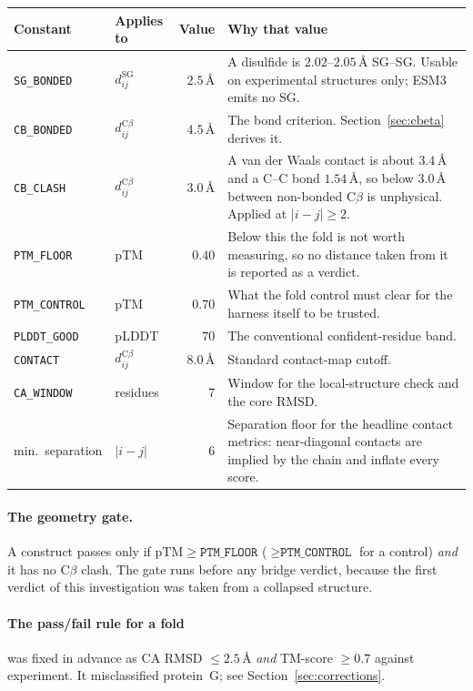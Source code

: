 \documentclass[11pt,a4paper]{article}
\newcommand{\ang}{\,\mbox{\AA}}
\newcommand{\ptm}{\mathrm{pTM}}
\newcommand{\plddt}{pLDDT}
\begin{document}
\begin{center}
\small
\begin{tabular}{@{}llrp{7.6cm}@{}}
\toprule
Constant & Applies to & Value & Why that value \\
\midrule
\texttt{SG\_BONDED}  & $d^{\mathrm{SG}}_{ij}$ & $2.5\ang$ &
  A disulfide is $2.02$--$2.05\ang$ SG--SG. Usable on experimental
  structures only; ESM3 emits no SG. \\
\texttt{CB\_BONDED}  & $d^{\mathrm{C}\beta}_{ij}$ & $4.5\ang$ &
  The bond criterion. Section~\ref{sec:cbeta} derives it. \\
\texttt{CB\_CLASH}   & $d^{\mathrm{C}\beta}_{ij}$ & $3.0\ang$ &
  A van der Waals contact is about $3.4\ang$ and a C--C bond $1.54\ang$, so
  below $3.0\ang$ between non-bonded C$\beta$ is unphysical. Applied at
  $|i-j| \ge 2$. \\
\texttt{PTM\_FLOOR}  & $\ptm$ & $0.40$ &
  Below this the fold is not worth measuring, so no distance taken from it is
  reported as a verdict. \\
\texttt{PTM\_CONTROL}& $\ptm$ & $0.70$ &
  What the fold control must clear for the harness itself to be trusted. \\
\texttt{PLDDT\_GOOD} & \plddt{} & $70$ &
  The conventional confident-residue band. \\
\texttt{CONTACT}     & $d^{\mathrm{C}\beta}_{ij}$ & $8.0\ang$ &
  Standard contact-map cutoff. \\
\texttt{CA\_WINDOW}  & residues & $7$ &
  Window for the local-structure check and the core RMSD. \\
min.\ separation     & $|i-j|$ & $6$ &
  Separation floor for the headline contact metrics: near-diagonal contacts are
  implied by the chain and inflate every score. \\
\bottomrule
\end{tabular}
\end{center}

\paragraph{The geometry gate.} A construct passes only if $\ptm \ge
\texttt{PTM\_FLOOR}$ ($\ge \texttt{PTM\_CONTROL}$ for a control) \emph{and} it
has no C$\beta$ clash. The gate runs before any bridge verdict, because the
first verdict of this investigation was taken from a collapsed structure.

\paragraph{The pass/fail rule for a fold} was fixed in advance as CA RMSD $\le
2.5\ang$ \emph{and} TM-score $\ge 0.7$ against experiment. It misclassified
protein~G; see Section~\ref{sec:corrections}.
\end{document}
